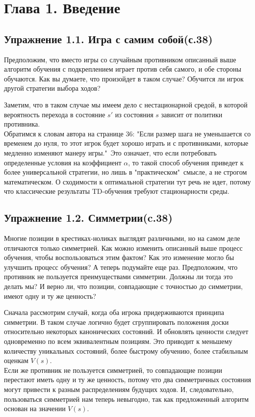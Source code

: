 \section{Глава 1. Введение}
\subsection{Упражнение 1.1. Игра с самим собой(с.38)}
Предположим, что вместо игры со случайным противником описанный выше алгоритм обучения с подкреплением играет против себя самого, и обе стороны обучаются. Как вы думаете, что произойдет в таком случае? Обучится ли игрок другой стратегии выбора ходов?
\begin{solution}
    Заметим, что в таком случае мы имеем дело с нестационарной средой, в которой вероятность перехода в состояние $s'$ из состояния $s$ зависит от политики противника. \\
    Обратимся к словам автора на странице 36: "Если размер шага не уменьшается со временем до нуля, то этот игрок будет хорошо играть и с противниками, которые медленно изменяют манеру игры."\ Это означает, что если потребовать определенные условия на коэффициент $\alpha$, то такой способ обучения приведет к более универсальной стратегии, но лишь в "практическом"\ смысле, а не строгом математическом. О сходимости к оптимальной стратегии тут речь не идет, потому что классические результаты TD-обучения требуют стационарности среды.
\end{solution}

\subsection{Упражнение 1.2. Симметрии(c.38)}
Многие позиции в крестиках-ноликах выглядят различными, но на самом деле отличаются только симметрией. Как можно изменить описанный выше процесс обучения, чтобы воспользоваться этим фактом? Как это изменение могло бы улучшить процесс обучения? А теперь подумайте еще раз. Предположим, что противник не пользуется преимуществами симметрии. Должны ли тогда это делать мы? И верно ли, что позиции, совпадающие с точностью до симметрии, имеют одну и ту же ценность? 
\begin{solution}
    Сначала рассмотрим случай, когда оба игрока придерживаются принципа симметрии. В таком случае логично будет сгруппировать положения доски относительно некоторых канонических состояний. И обновлять ценности следует одновременно по всем эквивалентным позициям. Это приводит к меньшему количеству уникальных состояний, более быстрому обучению, более стабильным оценкам $V(s)$. \\
    Если же противник не пользуется симметрией, то совпадающие позиции перестают иметь одну и ту же ценность, потому что два симметричных состояния могут привести к разным распределениям будущих ходов. И, следовательно, пользоваться симметрией нам теперь невыгодно, так как предложенный алгоритм основан на значении $V(s)$.
\end{solution}

